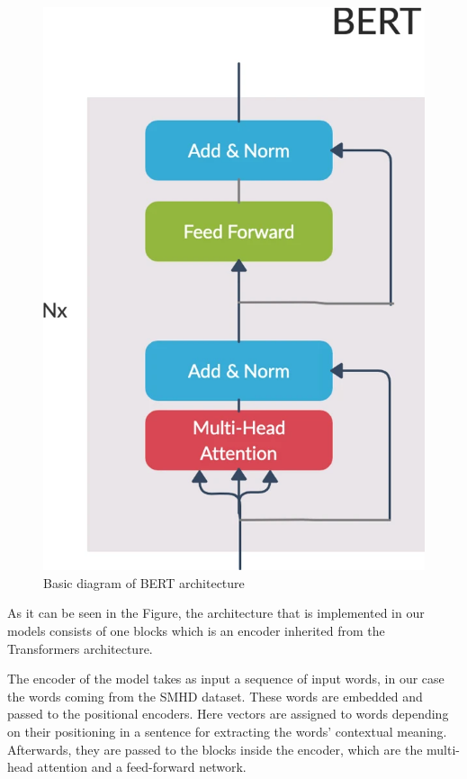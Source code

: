\begin{figure}[!htp]
    \centering
    \includegraphics[scale=0.3]{img/detection/bertarchitecture.png}
    \caption{Basic diagram of BERT architecture}
    \label{fig:BERTarchitecture}
\end{figure}

As it can be seen in the Figure, the architecture that is implemented in our models consists of one blocks which is an encoder inherited from the Transformers architecture.

The encoder of the model takes as input a sequence of input words, in our case the words coming from the SMHD dataset. These words are embedded and passed to the positional encoders. Here vectors are assigned to words depending on their positioning in a sentence for extracting the words' contextual meaning. Afterwards, they are passed to the blocks inside the encoder, which are the multi-head attention and a feed-forward network.  

